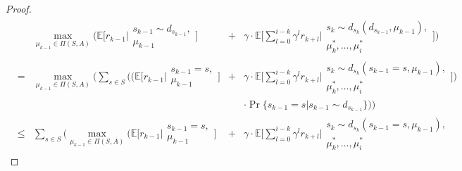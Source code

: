 \documentclass[11pt]{article} %
\begin{document}
\begin{proof}
\begin{equation}
	\begin{array}{rrccl}
		& 	&	\max\limits_{\mu_{k-1} \in \Pi(S,A)} \Big( \mathbb{E}\Big[ r_{k-1} \Big| \begin{array}{c}
																						s_{k-1} \sim d_{s_{k-1}}, \\
																						\mu_{k-1}
																					\end{array} \Big]  & + & \gamma \cdot \mathbb{E} \Big[ \sum\limits_{l=0}^{i-k} \gamma^l r_{k+l} \Big| \begin{array}{c}
																																																s_k \sim d_{s_k}(d_{s_{k-1}},\mu_{k-1}), \\
																																																\mu_k^*,\dots,\mu_i^*
																																															\end{array} \Big] \Big) \\
		& =		&	\max\limits_{\mu_{k-1} \in \Pi(S,A)} \Big( \sum\limits_{s \in S}^{} \Big(  \Big( \mathbb{E}\Big[ r_{k-1} \Big| \begin{array}{c}
																						s_{k-1} = s, \\
																						\mu_{k-1}
																					\end{array} \Big]  & + & \gamma  \cdot \mathbb{E} \Big[ \sum\limits_{l=0}^{i-k} \gamma^l r_{k+l} \Big| \begin{array}{c}
																																																s_k \sim d_{s_k}(s_{k-1} = s,\mu_{k-1}), \\
																																																\mu_k^*,\dots,\mu_i^*
																																															\end{array} \Big] \Big) \\
		&		&		& 	& \cdot  \Pr\{ s_{k-1} = s | s_{k-1} \sim d_{s_{k-1}} \} \Big) \Big) \\
		& \le 	&	\sum\limits_{s \in S}^{} \Big( \max\limits_{\mu_{k-1} \in \Pi(S,A)} \Big( \mathbb{E}\Big[ r_{k-1} \Big| \begin{array}{c}
																						s_{k-1} = s, \\
																						\mu_{k-1}
																					\end{array} \Big]  & + & \gamma  \cdot \mathbb{E} \Big[ \sum\limits_{l=0}^{i-k} \gamma^l r_{k+l} \Big| \begin{array}{c}
																																																s_k \sim d_{s_k}(s_{k-1} = s,\mu_{k-1}), \\
																																																\mu_k^*,\dots,\mu_i^*

\end{array}
\end{array}
\end{equation}
\end{proof}
\end{document}
